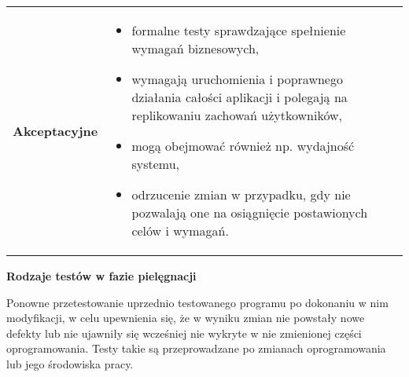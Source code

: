 \documentclass[../main.tex]{subfiles}
\begin{document}
\begin{table}[H]
\begin{center}
\begin{tabular}{ p{5cm} p{11cm} }
                \toprule

                \textbf{Akceptacyjne}
                &
                \begin{itemize}
                    \item formalne testy sprawdzające spełnienie wymagań biznesowych,
                    \item wymagają uruchomienia i
                    poprawnego działania całości aplikacji i polegają na replikowaniu zachowań użytkowników,
                    \item mogą obejmować również np. wydajność systemu,
                    \item odrzucenie zmian w przypadku, gdy nie pozwalają one na
                    osiągnięcie postawionych celów i wymagań.
                \end{itemize}
                \\
            \end{tabular}
        \end{center}
    \end{table}

    \textbf{Rodzaje testów w fazie pielęgnacji}

    Ponowne przetestowanie uprzednio testowanego programu po dokonaniu w nim modyfikacji, w celu upewnienia
    się, że w wyniku zmian nie powstały nowe defekty lub nie ujawniły się wcześniej nie wykryte w nie
    zmienionej części oprogramowania. Testy takie są przeprowadzane po zmianach oprogramowania lub jego
    środowiska pracy.
\end{document}
